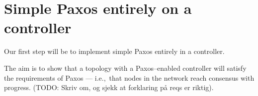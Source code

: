 \chapter{Simple Paxos entirely on a controller}

Our first step will be to implement simple Paxos \cite{Lam01} entirely in a
controller.

The aim is to show that a topology with a Paxos--enabled controller will
satisfy the requirements of Paxos --- i.e.,~that nodes in the network reach
consensus with progress. (TODO: Skriv om, og sjekk at forklaring på reqs er
riktig).
